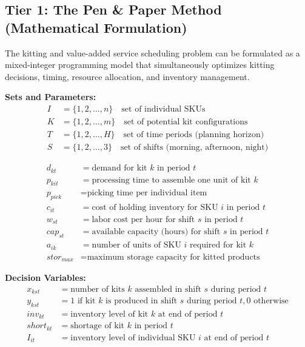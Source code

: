 \documentclass{article}
\begin{document}
\subsection{Tier 1: The Pen \& Paper Method (Mathematical Formulation)}

The kitting and value-added service scheduling problem can be formulated as a mixed-integer programming model that simultaneously optimizes kitting decisions, timing, resource allocation, and inventory management.

\textbf{Sets and Parameters:}
\begin{align}
I &= \{1, 2, \ldots, n\} \quad \text{set of individual SKUs} \\
K &= \{1, 2, \ldots, m\} \quad \text{set of potential kit configurations} \\
T &= \{1, 2, \ldots, H\} \quad \text{set of time periods (planning horizon)} \\
S &= \{1, 2, \ldots, 3\} \quad \text{set of shifts (morning, afternoon, night)}
\end{align}

\begin{align}
d_{kt} &= \text{demand for kit } k \text{ in period } t \\
p_{kit} &= \text{processing time to assemble one unit of kit } k \\
p_{pick} &= \text{picking time per individual item} \\
c_{it} &= \text{cost of holding inventory for SKU } i \text{ in period } t \\
w_{st} &= \text{labor cost per hour for shift } s \text{ in period } t \\
cap_{st} &= \text{available capacity (hours) for shift } s \text{ in period } t \\
a_{ik} &= \text{number of units of SKU } i \text{ required for kit } k \\
stor_{max} &= \text{maximum storage capacity for kitted products}
\end{align}

\textbf{Decision Variables:}
\begin{align}
x_{kst} &= \text{number of kits } k \text{ assembled in shift } s \text{ during period } t \\
y_{kst} &= 1 \text{ if kit } k \text{ is produced in shift } s \text{ during period } t, 0 \text{ otherwise} \\
inv_{kt} &= \text{inventory level of kit } k \text{ at end of period } t \\
short_{kt} &= \text{shortage of kit } k \text{ in period } t \\
I_{it} &= \text{inventory level of individual SKU } i \text{ at end of period } t
\end{align}
\end{document}
